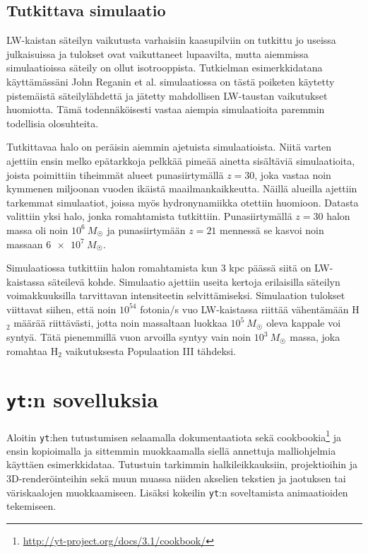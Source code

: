 \documentclass[12pt,a4paper]{article}
\newcommand{\yt}{\texttt{yt}}
\begin{document}
\subsection{Tutkittava simulaatio}
LW-kaistan säteilyn vaikutusta varhaisiin kaasupilviin on tutkittu jo useissa julkaisuissa ja tulokset ovat vaikuttaneet lupaavilta, mutta aiemmissa simulaatioissa säteily on ollut isotrooppista. Tutkielman esimerkkidatana käyttämässäni John Reganin et al. simulaatiossa on tästä poiketen käytetty pistemäistä säteilylähdettä ja jätetty mahdollisen LW-taustan vaikutukset huomiotta. Tämä todennäköisesti vastaa aiempia simulaatioita paremmin todellisia olosuhteita. \cite{rj}

Tutkittavaa halo on peräisin aiemmin ajetuista simulaatioista. Niitä varten ajettiin ensin melko epätarkkoja pelkkää pimeää ainetta sisältäviä simulaatioita, joista poimittiin tiheimmät alueet punasiirtymällä $z=30$, joka vastaa noin kymmenen miljoonan vuoden ikäistä maailmankaikkeutta. Näillä alueilla ajettiin tarkemmat simulaatiot, joissa myös hydronynamiikka otettiin huomioon. Datasta valittiin yksi halo, jonka romahtamista tutkittiin. Punasiirtymällä $z = 30$ halon massa oli noin $10^6~M_{\astrosun}$ ja punasiirtymään $z = 21$ mennessä se kasvoi noin massaan $\SI{6e7}{} M_{\astrosun}$. \cite{rj}

Simulaatiossa tutkittiin halon romahtamista kun 3 kpc päässä siitä on LW-kaistassa säteilevä kohde. Simulaatio ajettiin useita kertoja erilaisilla säteilyn voimakkuuksilla tarvittavan intensiteetin selvittämiseksi. Simulaation tulokset viittavat siihen, että noin $10^{54}$ fotonia/s vuo LW-kaistassa riittää vähentämään H$_2$ määrää riittävästi, jotta noin massaltaan luokkaa $10^5~M_{\astrosun}$ oleva kappale voi syntyä. Tätä pienemmillä vuon arvoilla syntyy vain noin $10^3~M_{\astrosun}$ massa, joka romahtaa H$_2$ vaikutuksesta Populaation III tähdeksi. \cite{rj}

\section{\yt :n sovelluksia}
Aloitin \yt :hen tutustumisen selaamalla dokumentaatiota sekä cookbookia\footnote{\url{http://yt-project.org/docs/3.1/cookbook/}} ja ensin kopioimalla ja sittemmin muokkaamalla siellä annettuja malliohjelmia käyttäen esimerkkidataa. Tutustuin tarkimmin halkileikkauksiin, projektioihin ja 3D-renderöinteihin sekä muun muassa niiden akselien tekstien ja jaotuksen tai väriskaalojen muokkaamiseen. Lisäksi kokeilin \yt :n soveltamista animaatioiden tekemiseen.
\end{document}
